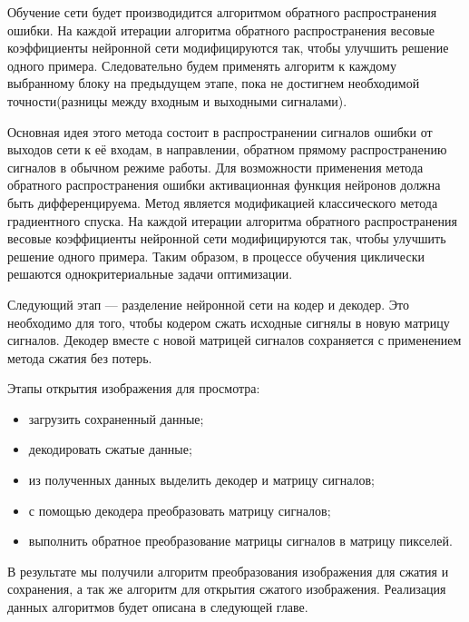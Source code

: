 Обучение сети будет производидится алгоритмом обратного распространения ошибки. На каждой итерации алгоритма обратного распространения
весовые коэффициенты нейронной сети модифицируются так, чтобы улучшить решение одного примера. Следовательно будем применять алгоритм к
каждому выбранному блоку на предыдущем этапе, пока не достигнем необходимой точности(разницы между входным и выходными сигналами).

Основная идея этого метода состоит в распространении сигналов ошибки от выходов сети к её входам, в направлении, обратном прямому распространению сигналов в обычном режиме работы.
Для возможности применения метода обратного распространения ошибки активационная функция нейронов должна быть дифференцируема.
Метод является модификацией классического метода градиентного спуска.
На каждой итерации алгоритма обратного распространения весовые коэффициенты нейронной сети модифицируются так, чтобы улучшить решение одного примера.
Таким образом, в процессе обучения циклически решаются однокритериальные задачи оптимизации.

Следующий этап --- разделение нейронной сети на кодер и декодер. Это необходимо для того, чтобы кодером сжать исходные сигнялы в новую матрицу сигналов.
Декодер вместе с новой матрицей сигналов сохраняется с применением метода сжатия без потерь.

Этапы открытия изображения для просмотра:
\begin{itemize}
  \item загрузить сохраненный данные;
  \item декодировать сжатые данные;
  \item из полученных данных выделить декодер и матрицу сигналов;
  \item с помощью декодера преобразовать матрицу сигналов;
  \item выполнить обратное преобразование матрицы сигналов в матрицу пикселей.
\end{itemize}

В результате мы получили алгоритм преобразования изображения для сжатия и сохранения,
а так же алгоритм для открытия сжатого изображения. Реализация данных алгоритмов будет описана в следующей главе.